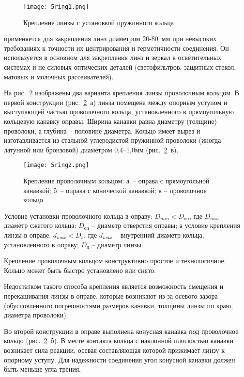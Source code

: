 \begin{figure}[h!]
	\begin{center}
		\texttt{[image: 5ring1.png]}
		\caption{ Крепление линзы с установкой пружинного кольца }
		\label{pic:5ring1}
	\end{center}
\end{figure}

  применяется для закрепления линз диаметром 20-80~мм при невысоких требованиях к точности их центрирования и герметичности соединения. Он используется в основном для закрепления линз и зеркал в осветительных системах и не силовых оптических деталей (светофильтров, защитных стекол, матовых и молочных рассеивателей).

На рис.~\ref{pic:5ring2} изображены два варианта крепления линзы проволочным кольцом. В первой конструкции (рис.~\ref{pic:5ring2}~а) линза помещена между опорным уступом и выступающей частью проволочного кольца, установленного в прямоугольную кольцевую канавку оправы. Ширина канавки равна диаметру (толщине) проволоки, а глубина -- половине диаметра. Кольцо имеет вырез и изготавливается из стальной углеродистой пружинной проволоки (иногда латунной или бронзовой) диаметром 0,4--1,0мм (рис.~\ref{pic:5ring2}~в).
\begin{figure}[h!]
	\texttt{[image: 5ring2.png]}
	\caption[Крепление проволочным кольцом]{ Крепление проволочным кольцом: а~-- оправа с прямоугольной канавкой; б~-- оправа с конической канавкой; в -- проволочное кольцо }
	\label{pic:5ring2}
\end{figure}

Условие установки проволочного кольца в оправу: $ D_{min} < D_\text{оп} $, где $ D_{min} $ -- диаметр сжатого кольца; $ D_\text{оп} $ -- диаметр отверстия оправы; а условие крепления линзы в оправе: $ d_{max} < D_\text{л} $, где $ d_{max} $ -- внутренний диаметр кольца, установленного в оправу; $ D_\text{л} $ -- диаметр линзы.

Крепление проволочным кольцом конструктивно простое и технологичное. Кольцо может быть быстро установлено или снято.

Недостатком такого способа крепления является возможность смещения и перекашивания линзы в оправе, которые возникают из-за осевого зазора (обусловленного погрешностями размеров канавки, толщины линзы по краю, диаметра проволоки).

Во второй конструкции в оправе выполнена конусная канавка под проволочное кольцо (рис.~\ref{pic:5ring2}~б). В месте контакта кольца с наклонной плоскостью канавки возникает сила реакции, осевая составляющая которой прижимает линзу к опорному уступу. Для надежности соединения угол   конусной канавки должен быть меньше угла трения.

